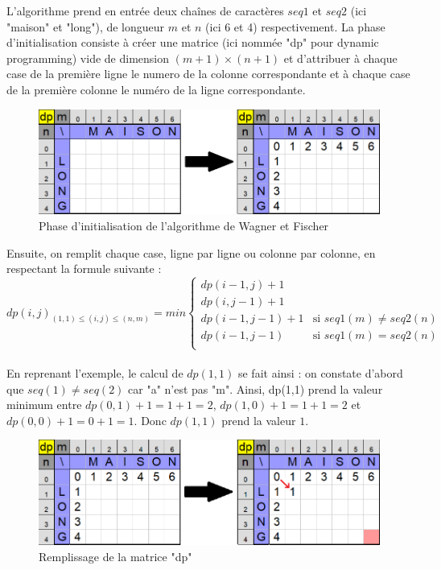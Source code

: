 \documentclass[12pt]{article}
\begin{document}
L'algorithme prend en entrée deux chaînes de caractères $seq1$ et $seq2$ (ici "maison" et "long"), de longueur $m$ et $n$ (ici 6 et 4) respectivement. La phase d'initialisation consiste à créer une matrice (ici nommée "dp" pour dynamic programming) vide de dimension $(m+1)\times (n+1)$ et d'attribuer à chaque case de la première ligne le numero de la colonne correspondante et à chaque case de la première colonne le numéro de la ligne correspondante.

\begin{figure}[!h]
    \centering
    \includegraphics[scale = 0.7]{Images/Levenstein/pre init levenstein.png}
    \caption{Phase d'initialisation de l'algorithme de Wagner et Fischer}
    \label{fig:Phase d'initialisation de l'algorithme de Wagner et Fischer}
\end{figure}

Ensuite, on remplit chaque case, ligne par ligne ou colonne par colonne, en respectant la formule suivante :\\

$dp(i,j)_{(1,1)\leq (i,j)\leq (n,m)} = min\left\{
\begin{array}{ll}
dp(i-1,j)+1\\
dp(i,j-1)+1\\
dp(i-1,j-1) +1 & \mbox{si } seq1(m)\neq seq2(n) \\
dp(i-1,j-1) & \mbox{si } seq1(m) = seq2(n) \\
\end{array}
\right.$\\\\

En reprenant l'exemple, le calcul de $dp(1,1)$ se fait ainsi : on constate d'abord que $seq(1)\neq seq(2)$ car "a" n'est pas "m". Ainsi, dp(1,1) prend la valeur minimum entre $dp(0,1)+1=1+1=2$, $dp(1,0)+1=1+1=2$ et $dp(0,0)+1=0+1=1$. Donc $dp(1,1)$ prend la valeur $1$.\\

\begin{figure}[!h]
    \centering
    \includegraphics[scale = 0.69]{Images/Levenstein/remplissage levenstein.png}
    \caption{Remplissage de la matrice "dp"}
    \label{fig:Remplissage de la matrice "dp"}
\end{figure}
\end{document}

